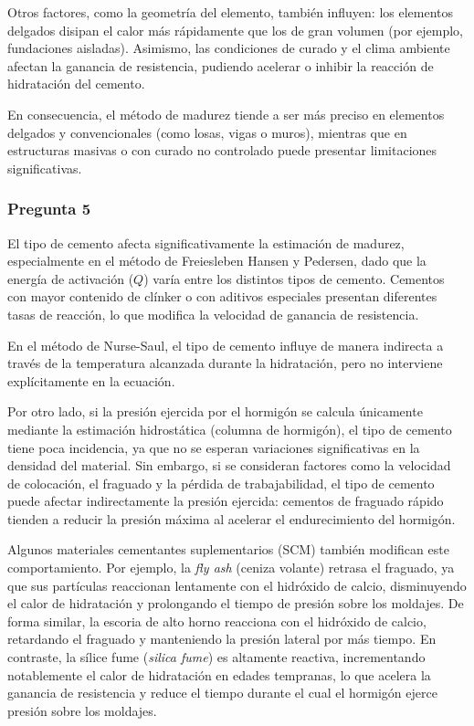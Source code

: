 Otros factores, como la geometría del elemento, también influyen: los elementos delgados disipan el calor más rápidamente que los de gran volumen (por ejemplo, fundaciones aisladas).  
Asimismo, las condiciones de curado y el clima ambiente afectan la ganancia de resistencia, pudiendo acelerar o inhibir la reacción de hidratación del cemento.  

En consecuencia, el método de madurez tiende a ser más preciso en elementos delgados y convencionales (como losas, vigas o muros), mientras que en estructuras masivas o con curado no controlado puede presentar limitaciones significativas.

\subsubsection*{Pregunta 5} 

El tipo de cemento afecta significativamente la estimación de madurez, especialmente en el método de Freiesleben Hansen y Pedersen, dado que la energía de activación ($Q$) varía entre los distintos tipos de cemento.  
Cementos con mayor contenido de clínker o con aditivos especiales presentan diferentes tasas de reacción, lo que modifica la velocidad de ganancia de resistencia.  

En el método de Nurse-Saul, el tipo de cemento influye de manera indirecta a través de la temperatura alcanzada durante la hidratación, pero no interviene explícitamente en la ecuación.

Por otro lado, si la presión ejercida por el hormigón se calcula únicamente mediante la estimación hidrostática (columna de hormigón), el tipo de cemento tiene poca incidencia, ya que no se esperan variaciones significativas en la densidad del material.  
Sin embargo, si se consideran factores como la velocidad de colocación, el fraguado y la pérdida de trabajabilidad, el tipo de cemento puede afectar indirectamente la presión ejercida: cementos de fraguado rápido tienden a reducir la presión máxima al acelerar el endurecimiento del hormigón.

Algunos materiales cementantes suplementarios (SCM) también modifican este comportamiento. Por ejemplo, la \textit{fly ash} (ceniza volante) retrasa el fraguado, ya que sus partículas reaccionan lentamente con el hidróxido de calcio, disminuyendo el calor de hidratación y prolongando el tiempo de presión sobre los moldajes.  
De forma similar, la escoria de alto horno reacciona con el hidróxido de calcio, retardando el fraguado y manteniendo la presión lateral por más tiempo.  
En contraste, la sílice fume (\textit{silica fume}) es altamente reactiva, incrementando notablemente el calor de hidratación en edades tempranas, lo que acelera la ganancia de resistencia y reduce el tiempo durante el cual el hormigón ejerce presión sobre los moldajes.


